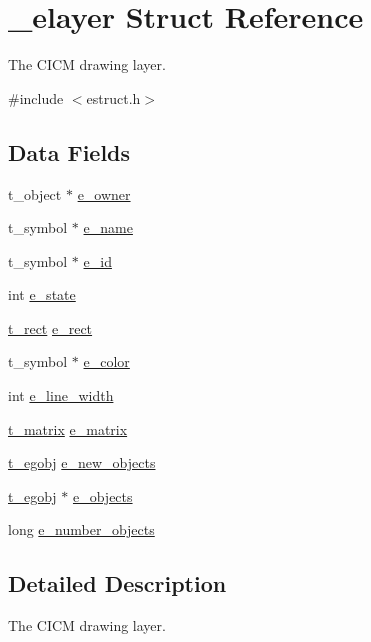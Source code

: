 \hypertarget{struct__elayer}{\section{\-\_\-elayer Struct Reference}
\label{struct__elayer}
}


The C\-I\-C\-M drawing layer.  




{\ttfamily \#include $<$estruct.\-h$>$}

\subsection*{Data Fields}
\begin{DoxyCompactItemize}
\item 
t\-\_\-object $\ast$ \hyperlink{struct__elayer_a2a35e154dc0053b0c8078d322ee1b5e3}{e\-\_\-owner}
\item 
t\-\_\-symbol $\ast$ \hyperlink{struct__elayer_a6d8c2140844c7949fe9bc0384b2129d8}{e\-\_\-name}
\item 
t\-\_\-symbol $\ast$ \hyperlink{struct__elayer_a1f5d3d53b83fa9009ede11f8a9902dff}{e\-\_\-id}
\item 
int \hyperlink{struct__elayer_a6ebb09ffbaedff41ff95d74f7ebdb71b}{e\-\_\-state}
\item 
\hyperlink{struct__rect}{t\-\_\-rect} \hyperlink{struct__elayer_aaef55281ce06e8d04077acd1e73e484e}{e\-\_\-rect}
\item 
t\-\_\-symbol $\ast$ \hyperlink{struct__elayer_a13dfb00aea95e0dc5b9d1297260a9280}{e\-\_\-color}
\item 
int \hyperlink{struct__elayer_a4f088d61988de49543e814d4b5a74947}{e\-\_\-line\-\_\-width}
\item 
\hyperlink{struct__matrix}{t\-\_\-matrix} \hyperlink{struct__elayer_a62d53e14693deed3469c69dc3a857493}{e\-\_\-matrix}
\item 
\hyperlink{struct__egobj}{t\-\_\-egobj} \hyperlink{struct__elayer_a793a735e42cff87ab0df8772c76fe039}{e\-\_\-new\-\_\-objects}
\item 
\hyperlink{struct__egobj}{t\-\_\-egobj} $\ast$ \hyperlink{struct__elayer_a6f0b120b9e9be17af36ba96a368ffccb}{e\-\_\-objects}
\item 
long \hyperlink{struct__elayer_ad5b10c31f81ecf9116b72b70b25f9e79}{e\-\_\-number\-\_\-objects}
\end{DoxyCompactItemize}


\subsection{Detailed Description}
The C\-I\-C\-M drawing layer. 

